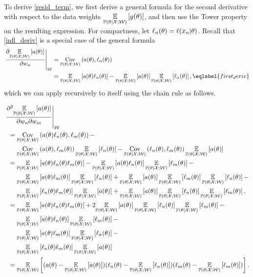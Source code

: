 \def\postg{\p(\gamma \vert \xvec)}
\def\postl{\p(\lambda \vert \xvec, \gamma)}


To derive \eqref{resid_term},
we first derive a general formula for the second derivative with 
respect to the data weights $\underset{\mathbb{P}(\theta | {\mathcal{X}}; \mathcal{W})}{\mathbb{E}}\left[g(\theta)\right]$, and then
use the Tower property on the resulting expression.  For compactness,
let $\ell_n(\theta) = \ell(x_n \vert \theta)$.  Recall
that \eqref{infl_deriv} is a special case of the general
formula
%
$$
\begin{aligned}
    \fracat{\partial \expect{\postw}{a(\theta)}}{\partial \w_n}{\wvec}
    ={}&
    \cov{\postw}{a(\theta), \ell_n(\theta)}
    \\={}&
    \expect{\postw}{a(\theta) \ell_n(\theta)} -
    \expect{\postw}{a(\theta)} \expect{\postw}{\ell_n(\theta)},
    \eqlabel{first_deriv}
    \end{aligned}
$$
%
which we can apply recursively to itself using the chain rule as follows.

$$
\begin{aligned}
    \MoveEqLeft
\fracat{\partial^2 \expect{\postw}{a(\theta)}}{\partial \w_n \partial \w_m}{\wvec}
\\={}&
    \cov{\postw}{a(\theta) \ell_n(\theta), \ell_m(\theta)} -
    \\{}&
    \cov{\postw}{a(\theta), \ell_m(\theta)} \expect{\postw}{\ell_n(\theta)} -
    \cov{\postw}{\ell_n(\theta), \ell_m(\theta)} \expect{\postw}{a(\theta)}
\\={}&
    \expect{\postw}{a(\theta)\ell_n(\theta)\ell_m(\theta)} -
    \expect{\postw}{a(\theta) \ell_n(\theta)} \expect{\postw}{\ell_m(\theta)} -
\\{}&
    \expect{\postw}{a(\theta) \ell_m(\theta)} \expect{\postw}{\ell_n(\theta)} +
    \expect{\postw}{a(\theta)} \expect{\postw}{\ell_m(\theta)} \expect{\postw}{\ell_n(\theta)} -
\\{}&
    \expect{\postw}{\ell_n(\theta) \ell_m(\theta)} \expect{\postw}{a(\theta)} +
    \expect{\postw}{a(\theta)} \expect{\postw}{\ell_n(\theta)} \expect{\postw}{\ell_m(\theta)}.
\\={}&
    \expect{\postw}{a(\theta)\ell_n(\theta)\ell_m(\theta)} +
    2 \expect{\postw}{a(\theta)} \expect{\postw}{\ell_n(\theta)} \expect{\postw}{\ell_m(\theta)} -
\\{}&
    \expect{\postw}{a(\theta) \ell_n(\theta)} \expect{\postw}{\ell_m(\theta)} -
\\{}&
    \expect{\postw}{a(\theta) \ell_m(\theta)} \expect{\postw}{\ell_n(\theta)} -
\\{}&
    \expect{\postw}{\ell_n(\theta) \ell_m(\theta)} \expect{\postw}{a(\theta)}
\\={}&
\expect{\postw}{
    (a(\theta) - \expect{\postw}{a(\theta)})
    (\ell_n(\theta) - \expect{\postw}{\ell_n(\theta)})
    (\ell_m(\theta) - \expect{\postw}{\ell_m(\theta)})
}.
\end{aligned}
$$
%

